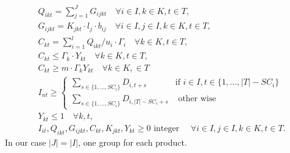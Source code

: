 \begin{ChapterAppendix}
$$\begin{aligned}
     & Q_{i k t}=\sum_{j=1}^J G_{i j k t} \quad \forall i \in I, k \in K, t \in T,                                                                     \\
     & G_{i j k t}=K_{j k t} \cdot l_j \cdot b_{i j} \quad \forall i \in I, j \in I, k\in K, t \in T,                                                  \\
     & C_{k t}=\sum_{i=1}^l Q_{i k t} / u_i \cdot \Gamma_i \quad \forall k \in K, t \in T,                                                             \\
     & C_{k t} \leqslant \Gamma_k \cdot Y_{k t}\quad \forall k \in K, t \in T,                                                                         \\
     & C_{k t} \geqslant m \cdot \Gamma_k Y_{k t} \quad \forall k \in K, \in T                                                                         \\
     & I_{n t }\geq     \begin{cases}
                          \sum_{s \in \lbrace 1 , \dots , SC_i \rbrace } D_{i,t+s} \quad  & \text{if } i\in I, t \in \lbrace 1, \dots , |T|-SC_i \rbrace \\
                          \sum_{s \in \lbrace 1 , \dots , SC_i \rbrace } D_{i,|T|-SC_i+s} & \text{ other wise }
                        \end{cases} \\
     & Y_{k t} \leqslant 1 \quad \forall k, t,                                                                                                         \\
     & I_{i t}, Q_{i k t}, G_{i j k t}, C_{k t}, K_{j k t}, Y_{k t} \geqslant 0 \text { integer } \quad \forall i \in I, j \in I, k \in K, t \in T .
  \end{aligned}
$$
In our case $|J|=|I|$, one group for each product.

\end{ChapterAppendix}
